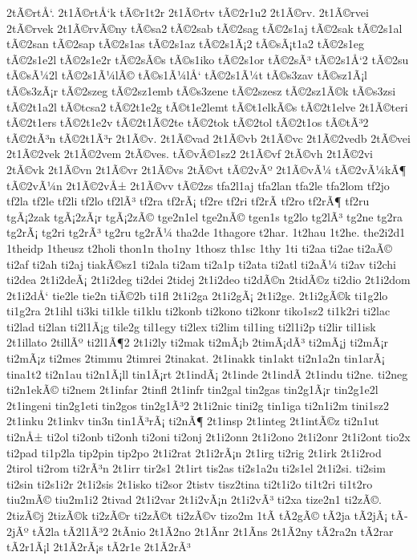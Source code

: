 {2tÃ©rtÅ‘.
2t1Ã©rtÅ‘k
tÃ©r1t2r
2t1Ã©rtv
tÃ©2r1u2
2t1Ã©rv.
2t1Ã©rvei
2tÃ©rvek
2t1Ã©rvÃ©ny
tÃ©sa2
tÃ©2sab
tÃ©2sag
tÃ©2s1aj
tÃ©2sak
tÃ©2s1al
tÃ©2san
tÃ©2sap
tÃ©2s1as
tÃ©2s1az
tÃ©2s1Ã¡2
tÃ©sÃ¡t1a2
tÃ©2s1eg
tÃ©2s1e2l
tÃ©2s1e2r
tÃ©2sÃ©s
tÃ©s1iko
tÃ©2s1or
tÃ©2sÃ³
tÃ©2s1Å‘2
tÃ©2su
tÃ©sÃ¼2l
tÃ©2s1Ã¼lÃ©
tÃ©s1Ã¼lÅ‘
tÃ©2s1Ã¼t
tÃ©s3zav
tÃ©sz1Ã¡l
tÃ©s3zÃ¡r
tÃ©2szeg
tÃ©2sz1emb
tÃ©s3zene
tÃ©2szesz
tÃ©2sz1Ã©k
tÃ©s3zsi
tÃ©2t1a2l
tÃ©tcsa2
tÃ©2t1e2g
tÃ©t1e2lemt
tÃ©t1elkÃ©s
tÃ©2t1elve
2t1Ã©teri
tÃ©2t1ers
tÃ©2t1e2v
tÃ©2t1Ã©2te
tÃ©2tok
tÃ©2tol
tÃ©2t1os
tÃ©tÃ³2
tÃ©2tÃ³n
tÃ©2t1Ã³r
2t1Ã©v.
2t1Ã©vad
2t1Ã©vb
2t1Ã©vc
2t1Ã©2vedb
2tÃ©vei
2t1Ã©2vek
2t1Ã©2vem
2tÃ©ves.
tÃ©vÃ©1sz2
2t1Ã©vf
2tÃ©vh
2t1Ã©2vi
2tÃ©vk
2t1Ã©vn
2t1Ã©vr
2t1Ã©vs
2tÃ©vt
tÃ©2vÃº
2t1Ã©vÃ¼
tÃ©2vÃ¼kÃ¶
tÃ©2vÃ¼n
2t1Ã©2vÅ±
2t1Ã©vv
tÃ©2zs
tfa2l1aj
tfa2lan
tfa2le
tfa2lom
tf2jo
tf2la
tf2le
tf2li
tf2lo
tf2lÃ³
tf2ra
tf2rÃ¡
tf2re
tf2ri
tf2rÃ­
tf2ro
tf2rÃ¶
tf2ru
tgÃ¡2zak
tgÃ¡2zÃ¡r
tgÃ¡2zÃ©
tge2n1el
tge2nÃ©
tgen1s
tg2lo
tg2lÃ³
tg2ne
tg2ra
tg2rÃ¡
tg2ri
tg2rÃ³
tg2ru
tg2rÃ¼
tha2de
1thagore
t2har.
1t2hau
1t2he.
the2i2d1
1theidp
1theusz
t2holi
thon1n
tho1ny
1thosz
th1sc
1thy
1ti
ti2aa
ti2ae
ti2aÃ©
ti2af
ti2ah
ti2aj
tiakÃ©sz1
ti2ala
ti2am
ti2a1p
ti2ata
ti2atl
ti2aÃ¼
ti2av
ti2chi
ti2dea
2t1i2deÃ¡
2t1i2deg
ti2dei
2tidej
2t1i2deo
ti2dÃ©n
2tidÃ©z
ti2dio
2t1i2dom
2t1i2dÅ‘
tie2le
tie2n
tiÃ©2b
ti1fl
2t1i2ga
2t1i2gÃ¡
2t1i2ge.
2t1i2gÃ©k
ti1g2lo
ti1g2ra
2t1ihl
ti3ki
ti1kle
ti1klu
ti2konb
ti2kono
ti2konr
tiko1sz2
ti1k2ri
ti2lac
ti2lad
ti2lan
ti2l1Ã¡g
tile2g
til1egy
ti2lex
ti2lim
til1ing
ti2l1i2p
ti2lir
til1isk
2t1illato
2tillÃº
ti2l1Ã¶2
2t1i2ly
ti2mak
ti2mÃ¡b
2timÃ¡dÃ³
ti2mÃ¡j
ti2mÃ¡r
ti2mÃ¡z
ti2mes
2timmu
2timrei
2tinakat.
2t1inakk
tin1akt
ti2n1a2n
tin1arÃ¡
tina1t2
ti2n1au
ti2n1Ã¡ll
tin1Ã¡rt
2t1indÃ¡
2t1inde
2t1indÃ­
2t1indu
ti2ne.
ti2neg
ti2n1ekÃ©
ti2nem
2t1infar
2tinfl
2t1infr
tin2gal
tin2gas
tin2g1Ã¡r
tin2g1e2l
2t1ingeni
tin2g1eti
tin2gos
tin2g1Ã³2
2t1i2nic
tini2g
tin1iga
ti2n1i2m
tini1sz2
2t1inku
2t1inkv
tin3n
tin1Ã³rÃ¡
ti2nÃ¶
2t1insp
2t1integ
2t1intÃ©z
ti2n1ut
ti2nÅ±
ti2ol
ti2onb
ti2onh
ti2oni
ti2onj
2t1i2onn
2t1i2ono
2t1i2onr
2t1i2ont
tio2x
ti2pad
ti1p2la
tip2pin
tip2po
2t1i2rat
2t1i2rÃ¡n
2t1irg
ti2rig
2t1irk
2t1i2rod
2tirol
ti2rom
ti2rÃ³n
2t1irr
tir2s1
2t1irt
tis2as
ti2s1a2u
ti2s1el
2t1i2si.
ti2sim
ti2sin
ti2s1i2r
2t1i2sis
2t1isko
ti2sor
2tistv
tisz2tina
ti2t1i2o
ti1t2ri
ti1t2ro
tiu2mÃ©
tiu2m1i2
2tivad
2t1i2var
2t1i2vÃ¡n
2t1i2vÃ³
ti2xa
tize2n1
ti2zÃ©.
2tizÃ©j
2tizÃ©k
ti2zÃ©r
ti2zÃ©t
ti2zÃ©v
tizo2m
1tÃ­
tÃ­2gÃ©
tÃ­2ja
tÃ­2jÃ¡
tÃ­2jÃº
tÃ­2la
tÃ­2l1Ã³2
2tÃ­nio
2t1Ã­2no
2t1Ã­nr
2t1Ã­ns
2t1Ã­2ny
tÃ­2ra2n
tÃ­2rar
tÃ­2r1Ã¡l
2t1Ã­2rÃ¡s
tÃ­2r1e
2t1Ã­2rÃ³
}
